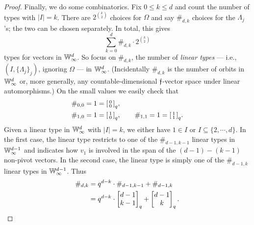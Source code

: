 \begin{proof}
    Finally, we do some combinatorics.
    Fix $0 \leq k \leq d$ and count the number of types with $|I| = k$.
    There are $2^{\binom{k}{2}}$ choices for $\Omega$ and say $\#_{d, k}$ choices for the $\Lambda_j$'s;
    the two can be chosen separately.
    In total, this gives
    \[ 
        \sum_{k=0}^d \#_{d, k} \cdot 2^{\binom{k}{2}}
    \]
    types for vectors in $\mathbb{W}_\infty^d$.
    So focus on $\#_{d, k}$, the number of \emph{linear types} --- i.e., $(I, \{\Lambda_j\}_j)$, ignoring $\Omega$ --- in $\mathbb{W}_\infty^d$.
    (Incidentally $\#_{d, k}$ is the number of orbits in $\mathbb{W}_\infty^d$ or, more generally, any countable-dimensional $\mathfrak{f}$-vector space under linear automorphisms.)
    On the small values we easily check that \begin{align*}
        &\#_{0, 0} = 1 = \begin{bsmallmatrix}0 \\ 0\end{bsmallmatrix}_q, \\
        &\#_{1, 0} = 1 = \begin{bsmallmatrix}1 \\ 0\end{bsmallmatrix}_q,\qquad
        \#_{1, 1} = 1 = \begin{bsmallmatrix}1 \\ 1\end{bsmallmatrix}_q.
    \end{align*}
    Given a linear type in $\mathbb{W}_\infty^d$ with $\vert I \vert = k$, 
    we either have $1 \in I$ or $I \subseteq \{2, \cdots, d\}$.
    In the first case, the linear type restricts to one of the $\#_{d-1, k-1}$ linear types in $\mathbb{W}_\infty^{d-1}$
    and indicates how $v_1$ is involved in the span of the $(d - 1) - (k - 1)$ non-pivot vectors.
    In the second case, the linear type is simply one of the $\#_{d-1, k}$ linear types in $\mathbb{W}_\infty^{d-1}$.
    Thus 
    \begin{align*}
        \#_{d, k} 
        &= q^{d-k} \cdot \#_{d-1, k-1} + \#_{d-1, k} \\
        &= q^{d-k} \cdot \begin{bmatrix}d-1 \\ k-1\end{bmatrix}_q + \begin{bmatrix}d-1 \\ k\end{bmatrix}_q.
        \qedhere
    \end{align*}
\end{proof}

